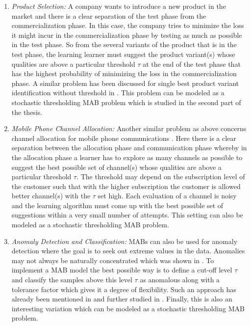 \begin{enumerate}
\item \emph{Product Selection:} A company wants to introduce a new product in the market and there is a clear separation of the test phase from the commercialization phase. In this case, the company tries to minimize the loss it might incur in the commercialization phase by testing as much as possible in the test phase. So from the several variants of the product that is in the test phase, the learning learner must suggest the product variant(s) whose qualities are above a particular threshold $\tau$ at the end of the test phase that has the highest probability of minimizing the loss in the commercialization phase. A similar problem has been discussed for single best product variant identification without threshold in \citet{bubeck2011pure}. This problem can be modeled as a stochastic thresholding MAB problem which is studied in the second part of the thesis.
\item \emph{Mobile Phone Channel Allocation:} Another similar problem as above concerns channel allocation for mobile phone communications \citep{audibert2009exploration}. Here there is a clear separation between the allocation phase and communication phase whereby in the allocation phase a learner has to explore as many channels as possible to suggest the best possible set of channel(s) whose qualities are above a particular threshold $\tau$. The threshold may depend on the subscription level of the customer such that with the higher subscription the customer is allowed better channel(s) with the $\tau$ set high. Each evaluation of a channel is noisy and the learning algorithm must come up with the best possible set of suggestions within a very small number of attempts. This setting can also be modeled as a stochastic thresholding MAB problem.
\item \emph{Anomaly Detection and Classification:} MABs can also be used for anomaly detection where the goal is to seek out extreme values in the data. Anomalies may not always be naturally concentrated which was shown in  \citet{steinwart2005classification}. To implement a MAB model the best possible way is to define a cut-off level $\tau$ and classify the samples above this level $\tau$ as anomalous along with a tolerance factor which gives it a degree of flexibility. Such an approach has already been mentioned in \citet{streeter2006selecting} and further studied in \citet{locatelli2016optimal}. Finally, this is also an interesting variation which can be modeled as a stochastic thresholding MAB problem.
\end{enumerate}


